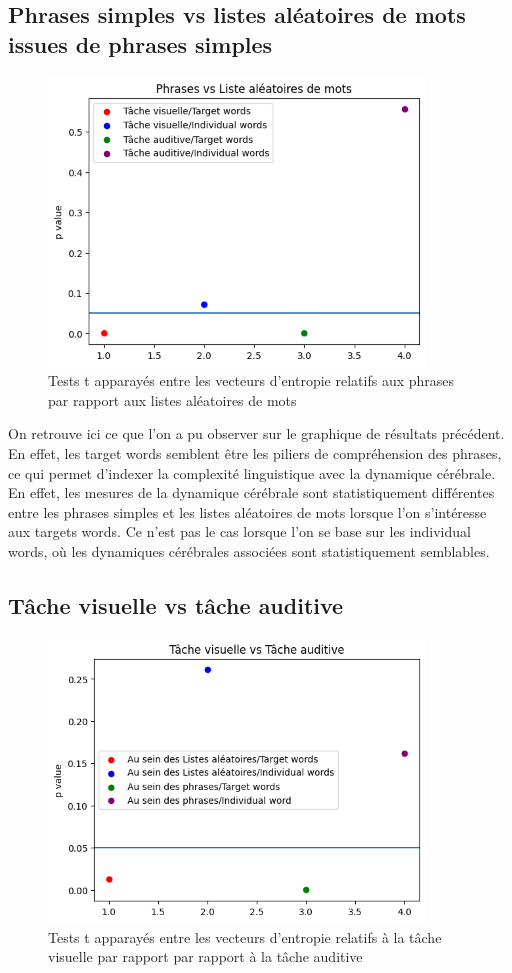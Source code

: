 \subsection{Phrases simples vs listes aléatoires de mots issues de phrases simples}

\begin{figure}[!ht]
    \centering
    \includegraphics[width=10cm]{Phrases_vs_Listes_aleatoires.png}
    \caption{Tests t apparayés entre les vecteurs d'entropie relatifs aux phrases par rapport aux listes aléatoires de mots}
    \label{fig6.2}
\end{figure}

On retrouve ici ce que l'on a pu observer sur le graphique de résultats précédent. En effet, les target words semblent être les piliers de compréhension des phrases, ce qui permet d'indexer la complexité linguistique avec la dynamique cérébrale. En effet, les mesures de la dynamique cérébrale sont statistiquement différentes entre les phrases simples et les listes aléatoires de mots lorsque l'on s'intéresse aux targets words. Ce n'est pas le cas lorsque l'on se base sur les individual words, où les dynamiques cérébrales associées sont statistiquement semblables.

\subsection{Tâche visuelle vs tâche auditive}

\begin{figure}[!ht]
    \centering
    \includegraphics[width=10cm]{visuelle_vs_auditive.png}
    \caption{Tests t apparayés entre les vecteurs d'entropie relatifs à la tâche visuelle par rapport par rapport à la tâche auditive}
    \label{fig6.3}
\end{figure}


